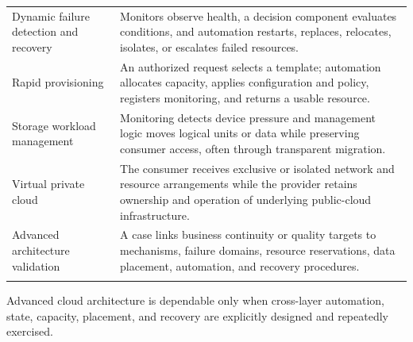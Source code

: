 \documentclass[11pt]{article}
\begin{document}
\begin{longtable}{@{}>{\RaggedRight\arraybackslash}p{}>{\RaggedRight\arraybackslash}p{}@{}}
Dynamic failure detection and recovery & Monitors observe health, a decision component evaluates conditions, and automation restarts, replaces, relocates, isolates, or escalates failed resources. \\\addlinespace[2pt]
Rapid provisioning & An authorized request selects a template; automation allocates capacity, applies configuration and policy, registers monitoring, and returns a usable resource. \\\addlinespace[2pt]
Storage workload management & Monitoring detects device pressure and management logic moves logical units or data while preserving consumer access, often through transparent migration. \\\addlinespace[2pt]
Virtual private cloud & The consumer receives exclusive or isolated network and resource arrangements while the provider retains ownership and operation of underlying public-cloud infrastructure. \\\addlinespace[2pt]
Advanced architecture validation & A case links business continuity or quality targets to mechanisms, failure domains, resource reservations, data placement, automation, and recovery procedures. \\\addlinespace[2pt]
\bottomrule
\end{longtable}
\begin{takeawaybox}
Advanced cloud architecture is dependable only when cross-layer automation, state, capacity, placement, and recovery are explicitly designed and repeatedly exercised.
\end{takeawaybox}
\end{document}
